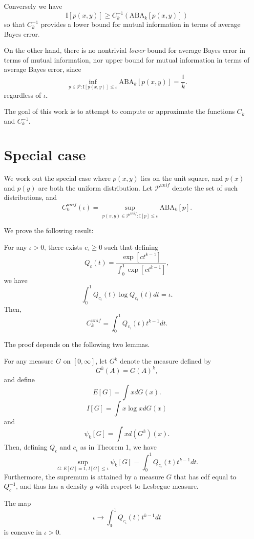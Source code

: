 \documentclass[12pt]{article}
\begin{document}
Conversely we have
\[
\text{I}[p(x,y)] \geq C^{-1}_k(\text{ABA}_k[p(x,y)])
\]
so that $C^{-1}_k$ provides a lower bound for mutual information in terms of average Bayes error.

On the other hand, there is no nontrivial \emph{lower} bound for average Bayes error in terms of mutual information,
nor upper bound for mutual information in terms of average Bayes error, since
\[
\inf_{p \in \mathcal{P}: \text{I}[p(x,y)] \leq \iota} \text{ABA}_k[p(x,y)] = \frac{1}{k}.
\]
regardless of $\iota$.

The goal of this work is to attempt to compute or approximate the functions $C_k$ and $C_k^{-1}$.

\section{Special case}

We work out the special case where $p(x,y)$ lies on the unit square, and $p(x)$ and $p(y)$ are both the uniform distribution.
Let $\mathcal{P}^{unif}$ denote the set of such distributions, and 
\[
C_k^{unif}(\iota) = \sup_{p(x, y) \in \mathcal{P}^{unif}: \text{I}[p] \leq \iota} \text{ABA}_k[p]. 
\]

We prove the following result:

\begin{theorem}
For any $\iota > 0$, there exists $c_\iota \geq 0$ such that defining
\[
Q_c(t) = \frac{\exp[ct^{k-1}]}{\int_0^1 \exp[ct^{k-1}]},
\]
we have
\[
\int_0^1 Q_{c_\iota}(t) \log Q_{c_\iota}(t) dt = \iota.
\]
Then,
\[
C_k^{unif} = \int_0^1 Q_{c_\iota}(t) t^{k-1} dt.
\]
\end{theorem}

The proof depends on the following two lemmas.

\begin{lemma}
For any measure $G$ on $[0, \infty]$,
let $G^k$ denote the measure defined by
\[
G^k(A) = G(A)^k,
\]
and define
\[
E[G] = \int x dG(x).
\]
\[
I[G] = \int x \log x dG(x)
\]
and
\[
\psi_k[G] = \int x d(G^k)(x).
\]
Then, defining $Q_c$ and $c_\iota$ as in Theorem 1, we have
\[
\sup_{G: E[G] = 1, I[G] \leq \iota} \psi_k[G] = \int_0^1 Q_{c_\iota}(t) t^{k-1} dt.
\]
Furthermore, the supremum is attained by a measure $G$ that has cdf
equal to $Q_c^{-1}$, and thus has a density $g$ with respect to
Lesbegue measure.
\end{lemma}


\begin{lemma}
The map
\[
\iota \to \int_0^1 Q_{c_\iota}(t) t^{k-1} dt
\]
is concave in $\iota > 0$.
\end{lemma}
\end{document}
